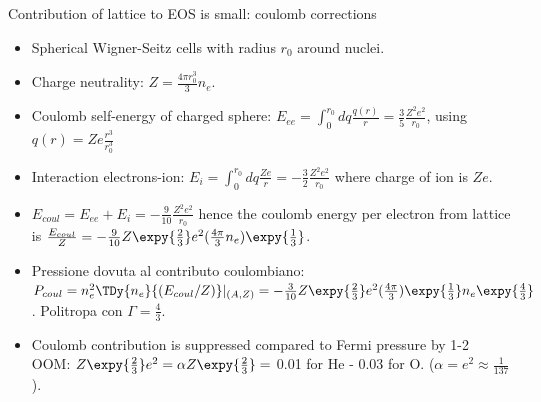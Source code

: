 \begin{frame}{Contribution of lattice to EOS is small: coulomb corrections}
    \begin{itemize}
        \item Spherical Wigner-Seitz cells with radius $r_0$ around nuclei.
        \item Charge neutrality: $Z=\frac{4\pi r_0^3}{3}n_e$.
        \item Coulomb self-energy of charged sphere: $E_{ee}=\int_0^{r_0}dq \frac{q(r)}{r}=\frac{3}{5}\frac{Z^2e^2}{r_0}$, using $q(r)=Ze \frac{r^3}{r_0^3}$
        \item Interaction electrons-ion: $E_i=\int_0^{r_0}dq \frac{Ze}{r}=-\frac{3}{2}\frac{Z^2e^2}{r_0}$ where charge of ion is $Ze$.
        \item $E_{coul}=E_{ee}+E_i=-\frac{9}{10}\frac{Z^2e^2}{r_0}$ hence the coulomb energy per electron from lattice is $\frac{E_{coul}}{Z}=-\frac{9}{10}Z\expy{\frac{2}{3}}e^2(\frac{4\pi}{3}n_e)\expy{\frac{1}{3}}$.
        \item Pressione dovuta al contributo coulombiano: $P_{coul}=n_e^2\TDy{n_e}{(E_{coul}/Z)}|_{(A,Z)}=-\frac{3}{10}Z\expy{\frac{2}{3}}e^2(\frac{4\pi}{3})\expy{\frac{1}{3}}n_e\expy{\frac{4}{3}}$. Politropa con $\Gamma=\frac{4}{3}$.
        \item Coulomb contribution is suppressed compared to Fermi pressure by 1-2 OOM: $Z\expy{\frac{2}{3}}e^2=\alpha Z\expy{\frac{2}{3}}=$ \num{0.01} for He - \num{0.03} for O. ($\alpha=e^2\approx \frac{1}{137}$).
    \end{itemize}
\end{frame}

